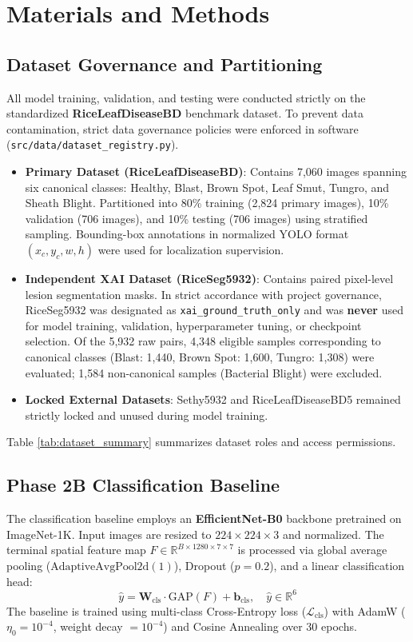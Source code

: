 \section{Materials and Methods}
\label{sec:materials_methods}

\subsection{Dataset Governance and Partitioning}
All model training, validation, and testing were conducted strictly on the standardized \textbf{RiceLeafDiseaseBD} benchmark dataset. To prevent data contamination, strict data governance policies were enforced in software (\texttt{src/data/dataset\_registry.py}).
\begin{itemize}
    \item \textbf{Primary Dataset (RiceLeafDiseaseBD)}: Contains 7,060 images spanning six canonical classes: Healthy, Blast, Brown Spot, Leaf Smut, Tungro, and Sheath Blight. Partitioned into 80\% training (2,824 primary images), 10\% validation (706 images), and 10\% testing (706 images) using stratified sampling. Bounding-box annotations in normalized YOLO format $(x_c, y_c, w, h)$ were used for localization supervision.
    \item \textbf{Independent XAI Dataset (RiceSeg5932)}: Contains paired pixel-level lesion segmentation masks. In strict accordance with project governance, RiceSeg5932 was designated as \texttt{xai\_ground\_truth\_only} and was \textbf{never} used for model training, validation, hyperparameter tuning, or checkpoint selection. Of the 5,932 raw pairs, 4,348 eligible samples corresponding to canonical classes (Blast: 1,440, Brown Spot: 1,600, Tungro: 1,308) were evaluated; 1,584 non-canonical samples (Bacterial Blight) were excluded.
    \item \textbf{Locked External Datasets}: Sethy5932 and RiceLeafDiseaseBD5 remained strictly locked and unused during model training.
\end{itemize}

Table \ref{tab:dataset_summary} summarizes dataset roles and access permissions.

\subsection{Phase 2B Classification Baseline}
The classification baseline employs an \textbf{EfficientNet-B0} backbone pretrained on ImageNet-1K. Input images are resized to $224 \times 224 \times 3$ and normalized. The terminal spatial feature map $F \in \mathbb{R}^{B \times 1280 \times 7 \times 7}$ is processed via global average pooling ($\text{AdaptiveAvgPool2d}(1)$), Dropout ($p=0.2$), and a linear classification head:
\begin{equation}
\hat{y} = \mathbf{W}_{\text{cls}} \cdot \text{GAP}(F) + \mathbf{b}_{\text{cls}}, \quad \hat{y} \in \mathbb{R}^6
\end{equation}
The baseline is trained using multi-class Cross-Entropy loss ($\mathcal{L}_{\text{cls}}$) with AdamW ($\eta_0 = 10^{-4}$, weight decay $= 10^{-4}$) and Cosine Annealing over 30 epochs.


